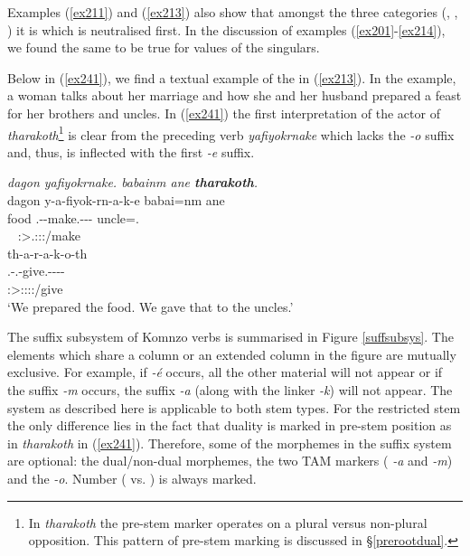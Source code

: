 Examples (\ref{ex211}) and (\ref{ex213}) also show that amongst the three categories (, , ) it is  which is neutralised first. In the discussion of examples (\ref{ex201}-\ref{ex214}), we found the same to be true for  values of the singulars.%

Below in (\ref{ex241}), we find a textual example of the   in (\ref{ex213}). In the example, a woman talks about her marriage and how she and her husband prepared a feast for her brothers and uncles. In (\ref{ex241}) the first  interpretation of the actor of \emph{tharakoth}\footnote{In \emph{tharakoth} the pre-stem marker operates on a plural versus non-plural opposition. This pattern of pre-stem marking is discussed in \S{}\ref{prerootdual}.} is clear from the preceding verb \emph{yafiyokrnake} which lacks the  \emph{-o} suffix and, thus, is inflected with the first  \emph{-e} suffix.

\begin{exe}
	\ex \emph{dagon yafiyokrnake. babainm ane \textbf{tharakoth}.}\\
	\glll dagon y-a-fiyok-rn-a-k-e babai=nm ane\\
	food \Tsg.\Masc-\Vc-make.\Ext-\Pst-\Lk-\Fnsg{} uncle=\Dat.\Nsg{} \Dem{}\\
	~ {\Fdu:\Sbj>\Tsg.\Masc:\Obj:\Pst:\Ipfv/make} ~ ~\\
	\sn
	\glll th-a-r-a-k-o-th\\
	\Stnsg.\Gam-\Vc.\Du-give.\Rs-\Pst-\Lk-\Andat-\Nsg\\
	\footnotesize{\Fdu:\Sbj>\Stpl:\Io:\Pst:\Pfv:\Andat/give}\\
	\trans `We prepared the food. We gave that to the uncles.' 
	\label{ex241}
\end{exe}

The suffix subsystem of Komnzo verbs is summarised in Figure \ref{suffsubsys}. The elements which share a column or an extended column in the figure are mutually exclusive. For example, if \emph{-é} occurs, all the other material will not appear or if the  suffix \emph{-m} occurs, the  suffix \emph{-a} (along with the linker \emph{-k}) will not appear. The system as described here is applicable to both stem types. For the restricted stem the only difference lies in the fact that duality is marked in pre-stem position as in \emph{tharakoth} in (\ref{ex241}). Therefore, some of the morphemes in the suffix system are optional: the dual/non-dual morphemes, the two TAM markers (\Pst{} \emph{-a} and \Dur{} \emph{-m}) and the  \emph{-o}. Number (\Sg{} vs. \Nsg) is always marked.

